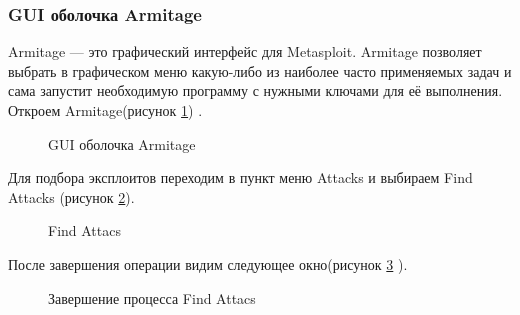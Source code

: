 \documentclass[10pt,a4paper]{report}
\begin{document}
\subsubsection{GUI оболочка Armitage}
Armitage — это графический интерфейс для Metasploit. Armitage позволяет выбрать в графическом меню какую-либо из наиболее часто применяемых задач и сама запустит необходимую программу с нужными ключами для её выполнения.
Откроем Armitage(рисунок \ref{ris:img1}) . \\
\begin{figure}[h]
\caption{GUI оболочка Armitage}
\label{ris:img1}  
\end{figure}
Для подбора эксплоитов переходим в пункт меню Attacks и выбираем Find Attacks (рисунок \ref{ris:img2}).\\
\begin{figure}[h]
\caption{Find Attacs}
\label{ris:img2}   
\end{figure}
После завершения операции видим следующее окно(рисунок \ref{ris:img3} ).\\
\begin{figure}[h]
\caption{Завершение процесса Find Attacs}
\label{ris:img3}   
\end{figure}
\end{document}
